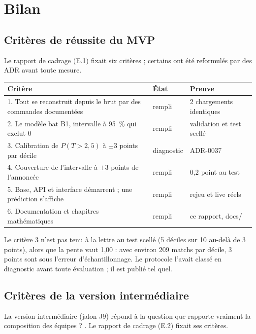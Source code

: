 
\chapter{Bilan}
\label{chap:bilan}

\section{Critères de réussite du MVP}

Le rapport de cadrage (E.1) fixait six critères ; certains ont été reformulés par des ADR avant toute
mesure.

\begin{center}
\begin{tabularx}{\textwidth}{Xll}
\toprule
Critère & État & Preuve \\
\midrule
1. Tout se reconstruit depuis le brut par des commandes documentées & rempli & 2 chargements identiques \\
2. Le modèle bat B1, intervalle à 95~\% qui exclut 0 & rempli & validation et test scellé \\
3. Calibration de \(P(T > 2{,}5)\) à \(\pm 3\) points par décile & diagnostic & ADR-0037 \\
4. Couverture de l'intervalle à \(\pm 3\) points de l'annoncée & rempli & 0,2 point au test \\
5. Base, API et interface démarrent ; une prédiction s'affiche & rempli & rejeu et live réels \\
6. Documentation et chapitres mathématiques & rempli & ce rapport, docs/ \\
\bottomrule
\end{tabularx}
\end{center}

Le critère 3 n'est pas tenu à la lettre au test scellé (5 déciles sur 10 au-delà de 3 points), alors que
la pente vaut 1,00 : avec environ 209 matchs par décile, 3 points sont sous l'erreur d'échantillonnage.
Le protocole l'avait classé en diagnostic avant toute évaluation ; il est publié tel quel.

\section{Critères de la version intermédiaire}
\label{sec:criteres-e2}

La version intermédiaire (jalon J9) répond à la question \og que rapporte vraiment la composition des
équipes ? \fg{}. Le rapport de cadrage (E.2) fixait ses critères.

